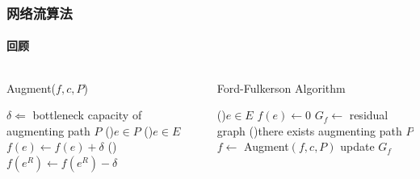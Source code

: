     \begin{frame}[plain]
        \frametitle{网络流算法}
        \framesubtitle{回顾}
        \begin{columns}
            \begin{column}{0.5\textwidth}
                \begin{algorithm}[H]
                    \caption{Augment($f,c,P$)}
                    $\delta\Leftarrow$ bottleneck capacity of augmenting path $P$\;
                    \ForEach(){$e\in P$}{
                        \If(){$e\in E$}{
                            $f(e)\leftarrow f(e)+\delta$\;
                        }
                        \Else(){
                            $f(e^R)\leftarrow f(e^R)-\delta$\;
                        }
                    }
                    \;
                \end{algorithm}
            \end{column}
            \begin{column}{0.5\textwidth}
                \begin{algorithm}[H]
                    \caption{Ford-Fulkerson Algorithm}
                    \ForEach(){$e\in E$}{
                        $f(e)\leftarrow 0$\;
                    }
                    $G_f\leftarrow$ residual graph\;
                    \While(){there exists augmenting path $P$}{
                        $f\leftarrow$ Augment$(f,c,P)$\;
                        update $G_f$\;
                    }
                    \;
                \end{algorithm}
            \end{column}
        \end{columns}
    \end{frame}    


